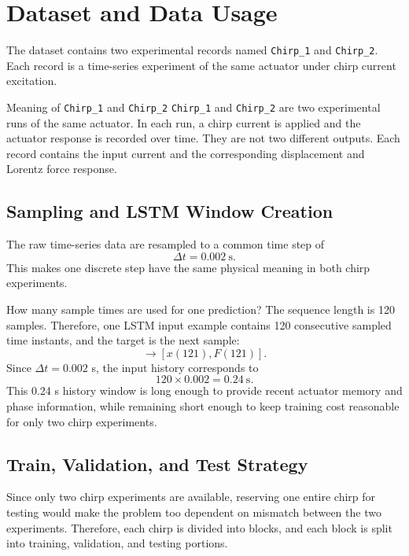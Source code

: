 \documentclass[11pt]{article}
\begin{document}
\section{Dataset and Data Usage}
The dataset contains two experimental records named \texttt{Chirp\_1} and \texttt{Chirp\_2}. Each record is a time-series experiment of the same actuator under chirp current excitation.

\begin{databox}{Meaning of \texttt{Chirp\_1} and \texttt{Chirp\_2}}
\texttt{Chirp\_1} and \texttt{Chirp\_2} are two experimental runs of the same actuator. In each run, a chirp current is applied and the actuator response is recorded over time. They are not two different outputs. Each record contains the input current and the corresponding displacement and Lorentz force response.
\end{databox}

\subsection{Sampling and LSTM Window Creation}
The raw time-series data are resampled to a common time step of
\begin{equation}
\Delta t = 0.002~\text{s}.
\end{equation}
This makes one discrete step have the same physical meaning in both chirp experiments.

\begin{databox}{How many sample times are used for one prediction?}
The sequence length is 120 samples. Therefore, one LSTM input example contains 120 consecutive sampled time instants, and the target is the next sample:
\begin{equation}
[I(1:120),x(1:120),F(1:120)]\rightarrow[x(121),F(121)].
\end{equation}
Since $\Delta t=0.002$ s, the input history corresponds to
\begin{equation}
120\times0.002 = 0.24~\text{s}.
\end{equation}
This 0.24 s history window is long enough to provide recent actuator memory and phase information, while remaining short enough to keep training cost reasonable for only two chirp experiments.
\end{databox}

\subsection{Train, Validation, and Test Strategy}
Since only two chirp experiments are available, reserving one entire chirp for testing would make the problem too dependent on mismatch between the two experiments. Therefore, each chirp is divided into blocks, and each block is split into training, validation, and testing portions.
\end{document}

